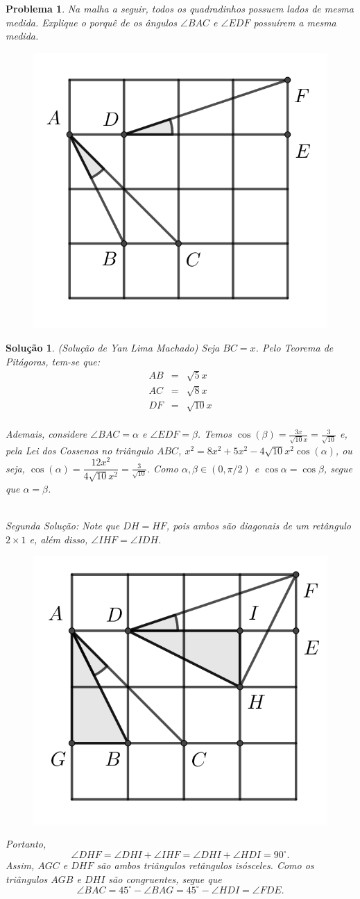\documentclass{hipatia}
\newtheorem{problem*}{Problema}
\newtheorem*{solution*}{Solução}
\begin{document}
\begin{problem*}
Na malha a seguir, todos os quadradinhos possuem lados de mesma medida. Explique o porquê de os ângulos $\angle BAC$ e $\angle EDF$ possuírem a mesma medida. 
	
	\begin{center}	
		\begin{figure}[!h]
	\centering
	\includegraphics[width=0.3\linewidth]{2024S17.png}
\end{figure}
\end{center}	
\end{problem*}

\begin{solution*} {\black (Solução de Yan Lima Machado) Seja $BC=x$. Pelo Teorema de Pitágoras, tem-se que:
\begin{eqnarray*}
AB & = & \sqrt{5}x\\
AC & = & \sqrt{8}x \\
DF & = & \sqrt{10}x \\
\end{eqnarray*}

\noindent Ademais, considere $\angle BAC=\alpha$ e $\angle EDF=\beta$. Temos $\cos(\beta)=\frac{3x}{\sqrt{10}x}=\frac{3}{\sqrt{10}}$ e, pela Lei dos Cossenos no triângulo $ABC$, 
$x^{2}=8x^{2}+5x^{2}-4\sqrt{10}x^{2}\cos(\alpha)$, ou seja, $ \cos(\alpha)=\dfrac{12x^2}{4\sqrt{10}x^2} = \frac{3}{\sqrt{10}}$. Como $\alpha, \beta \in (0,\pi/2)$ e $\cos \alpha = \cos \beta$, segue que $\alpha = \beta$.}\\


\noindent Segunda Solução:
Note que $DH = HF$, pois ambos são diagonais de um retângulo $2 \times 1$ e, além disso, $\angle IHF = \angle IDH$.

	\begin{center}	
		\begin{figure}[!h]
	\centering
	\includegraphics[width=0.3\linewidth]{2024S18.png}
\end{figure}
\end{center}	

\noindent Portanto, $$\angle DHF = \angle DHI + \angle IHF = \angle DHI + \angle HDI = 90^{\circ}.$$
Assim, $AGC$ e $DHF$ são ambos triângulos retângulos isósceles. Como os triângulos $AGB$ e $DHI$ são congruentes, segue que 
$$\angle BAC = 45^{\circ} - \angle BAG = 45^{\circ} - \angle HDI = \angle FDE.$$ 
\end{solution*}
\end{document}
